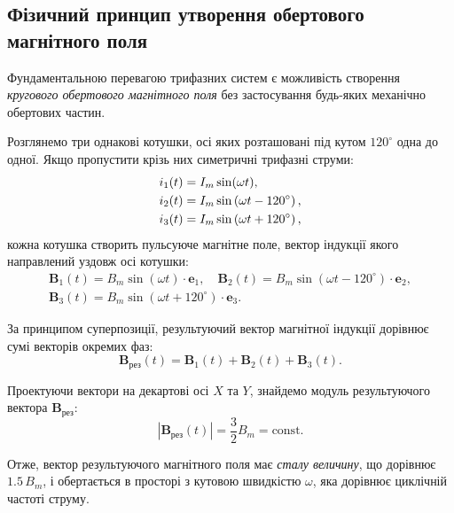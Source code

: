 \subsection*{Фізичний принцип утворення обертового магнітного поля}

Фундаментальною перевагою трифазних систем є можливість створення \emph{кругового обертового магнітного поля} без застосування будь-яких механічно обертових частин.

Розглянемо три однакові котушки, осі яких розташовані під кутом $120^\circ$ одна до одної. Якщо пропустити крізь них симетричні трифазні струми:
\begin{align}
	i_1(t) &= I_m \sin(\omega t), \notag \\
	i_2(t) &= I_m \sin\left(\omega t - 120^\circ\right), \\
	i_3(t) &= I_m \sin\left(\omega t + 120^\circ\right), \notag
\end{align}
кожна котушка створить пульсуюче магнітне поле, вектор індукції якого направлений уздовж осі котушки:
\begin{multline}
	\mathbf{B}_1(t) = B_m \sin(\omega t) \cdot \mathbf{e}_1, \quad \mathbf{B}_2(t) = B_m \sin(\omega t - 120^\circ) \cdot \mathbf{e}_2, \\ \mathbf{B}_3(t) = B_m \sin(\omega t + 120^\circ) \cdot \mathbf{e}_3.
\end{multline}

За принципом суперпозиції, результуючий вектор магнітної індукції дорівнює сумі векторів окремих фаз:
\begin{equation}
	\mathbf{B}_{\text{рез}}(t) = \mathbf{B}_1(t) + \mathbf{B}_2(t) + \mathbf{B}_3(t).
\end{equation}

Проектуючи вектори на декартові осі $X$ та $Y$, знайдемо модуль результуючого вектора $\mathbf{B}_{\text{рез}}$:
\begin{equation}
	|\mathbf{B}_{\text{рез}}(t)| = \frac{3}{2} B_m = \text{const}.
\end{equation}

Отже, вектор результуючого магнітного поля має \emph{сталу величину}, що дорівнює $1.5\,B_m$, і обертається в просторі з кутовою швидкістю $\omega$, яка дорівнює циклічній частоті струму.

